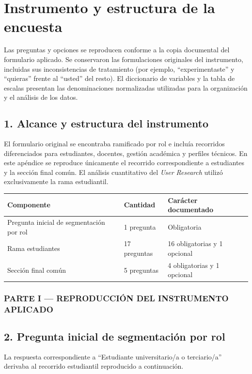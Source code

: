 \chapter{Instrumento y estructura de la encuesta}
\label{apx:encuesta}

Las preguntas y opciones se reproducen conforme a la copia documental del formulario aplicado. Se conservaron las formulaciones originales del instrumento, incluidas sus inconsistencias de tratamiento (por ejemplo, ``experimentaste'' y ``quieras'' frente al ``usted'' del resto). El diccionario de variables y la tabla de escalas presentan las denominaciones normalizadas utilizadas para la organización y el análisis de los datos.

\section*{1. Alcance y estructura del instrumento}
El formulario original se encontraba ramificado por rol e incluía recorridos diferenciados para estudiantes, docentes, gestión académica y perfiles técnicos. En este apéndice se reproduce únicamente el recorrido correspondiente a estudiantes y la sección final común. El análisis cuantitativo del \textit{User Research} utilizó exclusivamente la rama estudiantil.

\begin{center}\small
\begin{tabular}{@{}p{5.2cm}p{3.2cm}p{5.5cm}@{}}
\toprule
\rowcolor{accent!15}\textbf{Componente} & \textbf{Cantidad} & \textbf{Carácter documentado} \\
\midrule
Pregunta inicial de segmentación por rol & 1 pregunta & Obligatoria \\
Rama estudiantes & 17 preguntas & 16 obligatorias y 1 opcional \\
Sección final común & 5 preguntas & 4 obligatorias y 1 opcional \\
\bottomrule
\end{tabular}
\end{center}
\subsection*{PARTE I --- REPRODUCCIÓN DEL INSTRUMENTO APLICADO}
\section*{2. Pregunta inicial de segmentación por rol}
La respuesta correspondiente a ``Estudiante universitario/a o terciario/a'' derivaba al recorrido estudiantil reproducido a continuación.

